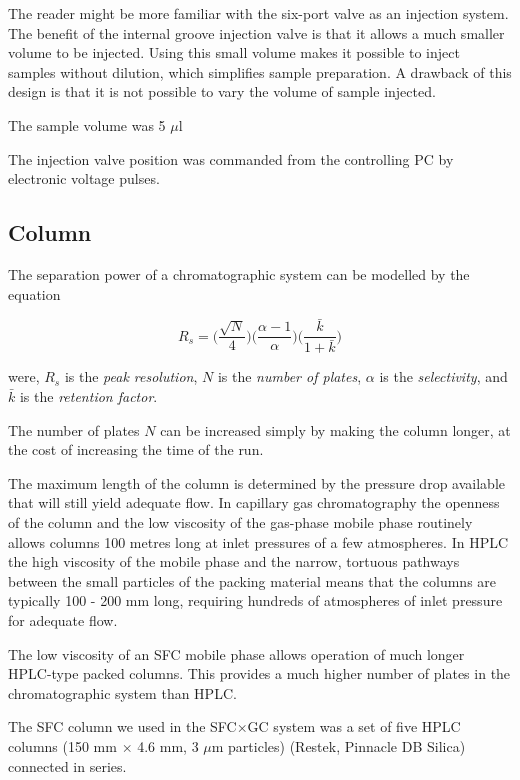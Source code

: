 The reader might be more familiar with the six-port valve as an injection
system. The benefit of the internal groove injection valve is that it allows a
much smaller volume to be injected. Using this small volume makes it possible to
inject samples without dilution, which simplifies sample preparation. A drawback
of this design is that it is not possible to vary the volume of sample injected.

The sample volume was 5 $\mu$l

The injection valve position was commanded from the controlling PC by electronic
voltage pulses.

\subsection{Column}
\label{sec:SFCColumn}

The separation power of a chromatographic system can be modelled by the equation 

\begin{equation}
R_s = \bigg(\frac{\sqrt{N}}{4}\bigg)  \bigg(\frac{\alpha-1}{\alpha}\bigg)  \bigg(\frac{\bar{k}}{1+\bar{k}}\bigg)
\end{equation}

were, $R_s$ is the \textit{peak resolution}, $N$ is the \textit{number of
plates}, $\alpha$ is the \textit{selectivity}, and $\bar{k}$ is the
\textit{retention factor}.
 
The number of plates $N$ can be increased simply by making the column longer,
at the cost of increasing the time of the run.

The maximum length of the column is determined by the pressure drop available
that will still yield adequate flow. In capillary gas chromatography the
openness of the column and the low viscosity of the gas-phase mobile phase
routinely allows columns 100 metres long at inlet pressures of a few
atmospheres. In HPLC the high viscosity of the mobile phase and the narrow,
tortuous pathways between the small particles of the packing material means that
the columns are typically 100 - 200 mm long, requiring hundreds of atmospheres
of inlet pressure for adequate flow.

The low viscosity of an SFC mobile phase allows operation of much longer
HPLC-type packed columns. This provides a much higher number of plates in the
chromatographic system than HPLC.

The SFC column we used in the SFC×GC system was a set of five HPLC columns (150
mm $\times$ 4.6 mm, 3 $\mu$m particles) (Restek, Pinnacle DB Silica) connected
in series.

